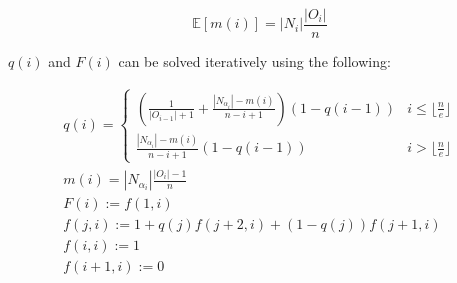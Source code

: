 \documentclass{article}
\newcommand{\expec}{\mathbb{E}}
\begin{document}
\begin{equation*}
\expec[m(i)] = |N_i|\frac{|O_i|}{n}
\end{equation*}

$q(i)$ and $F(i)$ can be solved iteratively using the following:

\begin{gather*}
q(i)= \begin{cases}
\left(\frac{1}{|O_{i-1}|+1} + \frac{|N_{\alpha_i}|-m(i)}{n-i+1}\right)(1-q(i-1)) &i\leq\lfloor\frac{n}{e}\rfloor \\
\frac{|N_{\alpha_i}|-m(i)}{n-i+1}(1-q(i-1)) &i>\lfloor\frac{n}{e}\rfloor
\end{cases} \\
m(i) = |N_{\alpha_i}|\frac{|O_i|-1}{n} \\
F(i) := f(1,i)\\
f(j,i) := 1+q(j)f(j+2,i) + (1-q(j))f(j+1,i)\\
f(i,i) := 1\\
f(i+1,i) := 0
\end{gather*}
\end{document}
